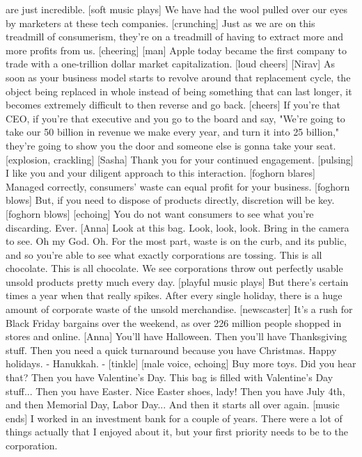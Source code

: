 \documentclass[a4paper]{article}
\begin{document}
	are just incredible.
	[soft music plays]
	We have had the wool pulled over our eyes by marketers at these tech companies.
	[crunching]
	Just as we are on this treadmill of consumerism,
	they're on a treadmill of having to extract more and more profits from us.
	[cheering]
	[man] Apple today became the first company
	to trade with a one-trillion dollar market capitalization.
	[loud cheers]
	[Nirav] As soon as your business model starts to revolve
	around that replacement cycle, the object being replaced in whole
	instead of being something that can last longer,
	it becomes extremely difficult to then reverse and go back.
	[cheers]
	If you're that CEO, if you're that executive
	and you go to the board and say, "We're going to take our
	50 billion in revenue we make every year, and turn it into 25 billion,"
	they're going to show you the door and someone else is gonna take your seat.
	[explosion, crackling]
	[Sasha] Thank you for your continued engagement.
	[pulsing]
	I like you and your diligent approach to this interaction.
	[foghorn blares]
	Managed correctly, consumers' waste can equal profit for your business.
	[foghorn blows]
	But, if you need to dispose of products directly,
	discretion will be key.
	[foghorn blows]
	[echoing] You do not want
	consumers to see what you're discarding.
	Ever.
	[Anna] Look at this bag.
	Look, look, look.
	Bring in the camera to see.
	Oh my God. Oh.
	For the most part, waste is on the curb, and its public,
	and so you're able to see
	what exactly corporations are tossing.
	This is all chocolate.
	This is all chocolate.
	We see corporations throw out perfectly usable unsold products
	pretty much every day.
	[playful music plays]
	But there's certain times a year when that really spikes.
	After every single holiday,
	there is a huge amount of corporate waste of the unsold merchandise.
	[newscaster] It's a rush for Black Friday bargains over the weekend,
	as over 226 million people shopped in stores and online.
	[Anna] You'll have Halloween.
	Then you'll have Thanksgiving stuff.
	Then you need a quick turnaround because you have Christmas.
	Happy holidays.
	- Hanukkah. - [tinkle]
	[male voice, echoing] Buy more toys.
	Did you hear that?
	Then you have Valentine's Day.
	This bag is filled with Valentine's Day stuff...
	Then you have Easter.
	Nice Easter shoes, lady!
	Then you have July 4th, and then Memorial Day, Labor Day...
	And then it starts all over again.
	[music ends]
	I worked in an investment bank for a couple of years.
	There were a lot of things actually that I enjoyed about it,
	but your first priority needs to be to the corporation.
\end{document}
